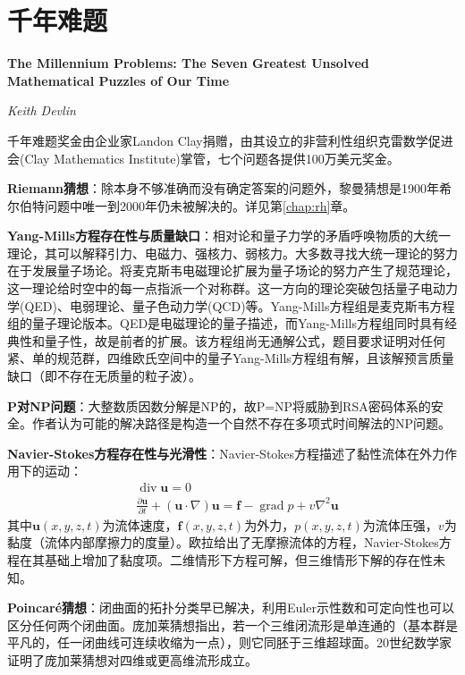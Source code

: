 \chapter{千年难题}
\Large\textbf{The Millennium Problems: The Seven Greatest Unsolved Mathematical Puzzles of Our Time}
\par \emph{Keith Devlin} \normalsize

\par 千年难题奖金由企业家Landon Clay捐赠，由其设立的非营利性组织克雷数学促进会(Clay Mathematics Institute)掌管，七个问题各提供100万美元奖金。

\par \textbf{Riemann猜想}：除本身不够准确而没有确定答案的问题外，黎曼猜想是1900年希尔伯特问题中唯一到2000年仍未被解决的。详见第\ref{chap:rh}章。

\par \textbf{Yang-Mills方程存在性与质量缺口}：相对论和量子力学的矛盾呼唤物质的大统一理论，其可以解释引力、电磁力、强核力、弱核力。大多数寻找大统一理论的努力在于发展量子场论。将麦克斯韦电磁理论扩展为量子场论的努力产生了规范理论，这一理论给时空中的每一点指派一个对称群。这一方向的理论突破包括量子电动力学(QED)、电弱理论、量子色动力学(QCD)等。Yang-Mills方程组是麦克斯韦方程组的量子理论版本。QED是电磁理论的量子描述，而Yang-Mills方程组同时具有经典性和量子性，故是前者的扩展。该方程组尚无通解公式，题目要求证明对任何紧、单的规范群，四维欧氏空间中的量子Yang-Mills方程组有解，且该解预言质量缺口（即不存在无质量的粒子波）。

\par \textbf{P对NP问题}：大整数质因数分解是NP的，故P=NP将威胁到RSA密码体系的安全。作者认为可能的解决路径是构造一个自然不存在多项式时间解法的NP问题。

\par \textbf{Navier-Stokes方程存在性与光滑性}：Navier-Stokes方程描述了黏性流体在外力作用下的运动：
\begin{align}
    &\operatorname{div} \mathbf{u} =0\\
    &\frac{\partial \mathbf{u}}{\partial t}+(\mathbf{u}\cdot  \nabla)\mathbf{u}=\mathbf{f}-\operatorname{grad} p + v \nabla^2 \mathbf{u}
\end{align}
其中$\mathbf{u}(x,y,z,t)$为流体速度，$\mathbf{f}(x,y,z,t)$为外力，$p(x,y,z,t)$为流体压强，$v$为黏度（流体内部摩擦力的度量）。欧拉给出了无摩擦流体的方程，Navier-Stokes方程在其基础上增加了黏度项。二维情形下方程可解，但三维情形下解的存在性未知。

\par \textbf{Poincaré猜想}：闭曲面的拓扑分类早已解决，利用Euler示性数和可定向性也可以区分任何两个闭曲面。庞加莱猜想指出，若一个三维闭流形是单连通的（基本群是平凡的，任一闭曲线可连续收缩为一点），则它同胚于三维超球面。20世纪数学家证明了庞加莱猜想对四维或更高维流形成立。

